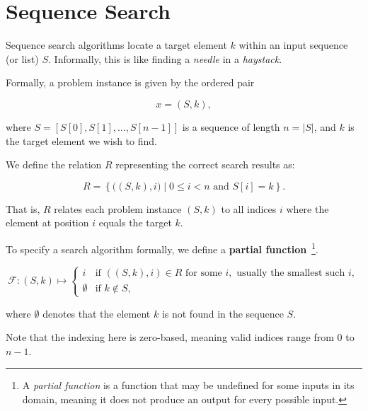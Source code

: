 \section{Sequence Search}

Sequence search algorithms locate a target element \( k \) within an input sequence (or list) \( S \). Informally, this is like finding a \emph{needle} in a \emph{haystack}.

Formally, a problem instance is given by the ordered pair

\[
x = (S, k),
\]

where \( S = [S[0], S[1], \ldots, S[n-1]] \) is a sequence of length \( n = |S| \), and \( k \) is the target element we wish to find.

We define the relation \( R \) representing the correct search results as:

\[
R = \left\{ \big((S, k), i\big) \mid 0 \leq i < n \text{ and } S[i] = k \right\}.
\]

That is, \( R \) relates each problem instance \((S, k)\) to all indices \( i \) where the element at position \( i \) equals the target \( k \).

To specify a search algorithm formally, we define a \textbf{partial function}~\footnote{A \emph{partial function} is a function that may be undefined for some inputs in its domain, meaning it does not produce an output for every possible input.}.


\[
\mathcal{F}: (S, k) \mapsto 
\begin{cases}
i & \text{if } ( (S, k), i ) \in R \text{ for some } i, \text{ usually the smallest such } i, \\
\emptyset & \text{if } k \notin S,
\end{cases}
\]

where \(\emptyset\) denotes that the element \( k \) is not found in the sequence \( S \).

Note that the indexing here is zero-based, meaning valid indices range from \(0\) to \(n-1\).
